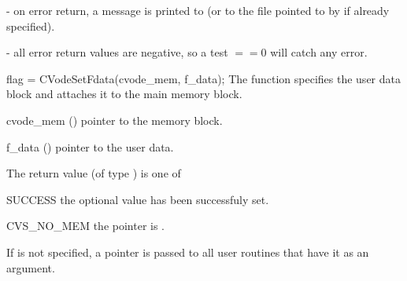 - on error return, a message is printed to  (or to
the file pointed to by  if already specified).

- all error return values are negative, so a test $==0$
will catch any error.



{
  flag = CVodeSetFdata(cvode\_mem, f\_data);
}
{
  The function  specifies the user data block
  and attaches it to the main {\cvodes} memory block.
}
{
  \begin{args}
  \item[cvode\_mem] ()
    pointer to the {\cvodes} memory block.
  \item[f\_data] ()
    pointer to the user data.
  \end{args}
}
{
  The return value  (of type ) is one of
  \begin{args}
  \item[SUCCESS] 
    the optional value has been successfuly set.
  \item[CVS\_NO\_MEM]
    the  pointer is .
  \end{args}
}
{
  If  is not specified, a  pointer is
  passed to all user routines that have it as an argument.
}


